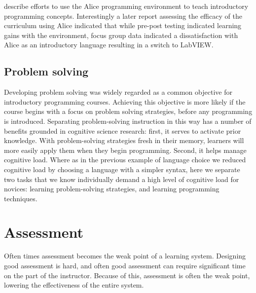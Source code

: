 \documentclass[12pt]{article}
\begin{document}
\citeauthor{snook_incorporation_2005} describe efforts to use the Alice
programming environment to teach introductory programming
concepts\autocite{snook_incorporation_2005}. Interestingly a later
report assessing the efficacy of the curriculum using Alice indicated
that while pre-post testing indicated learning gains with the
environment, focus group data indicated a dissatisfaction with Alice
as an introductory language resulting in a switch to
LabVIEW\autocite{lohani_reformulating_2011}. 

\subsection{Problem solving}
Developing problem solving was widely regarded as a common objective
for introductory programming courses. Achieving this objective is more
likely if the course begins with a focus on problem solving
strategies, before any programming is
introduced\autocite{koulouri_teaching_2014}. Separating
problem-solving instruction in this way has a number of benefits
grounded in cognitive science research: first, it serves to activate
prior knowledge\autocite{ambrose_how_2010}. With problem-solving
strategies fresh in their memory, learners will more easily apply them
when they begin programming. Second, it helps manage cognitive
load. Where as in the previous example of language choice we reduced
cognitive load by choosing a language with a simpler syntax, here we
separate two tasks that we know individually demand a high level of
cognitive load for novices: learning problem-solving strategies, and
learning programming techniques.


\section{Assessment}
Often times assessment becomes the weak point of a learning
system. Designing good assessment is
hard\autocite{lister_blooming_2000,traynor_synthesis_2005}, and often good assessment can
require significant time on the part of the instructor. Because of
this, assessment is often the weak point, lowering the effectiveness
of the entire system.
\end{document}
